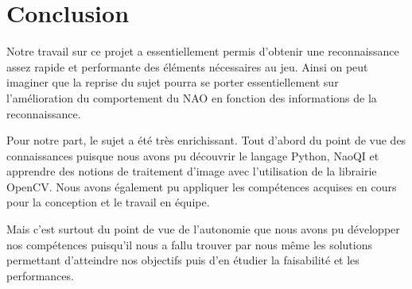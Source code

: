 \section{Conclusion}
\label{sec:Conclusion}
  \par Notre travail sur ce projet a essentiellement permis d'obtenir une reconnaissance assez rapide et performante des éléments nécessaires au jeu.
  Ainsi on peut imaginer que la reprise du sujet pourra se porter essentiellement sur l'amélioration du comportement du NAO en fonction des informations de la reconnaissance.
  \par Pour notre part, le sujet a été très enrichissant.
  Tout d'abord du point de vue des connaissances puisque nous avons pu découvrir le langage Python, NaoQI et apprendre des notions de traitement d'image avec l'utilisation de la librairie OpenCV.
  Nous avons également pu appliquer les compétences acquises en cours pour la conception et le travail en équipe.
  \par Mais c'est surtout du point de vue de l'autonomie que nous avons pu développer nos compétences puisqu'il nous a fallu trouver par nous même les solutions permettant d'atteindre nos objectifs puis d'en étudier la faisabilité et les performances.
\pagebreak
